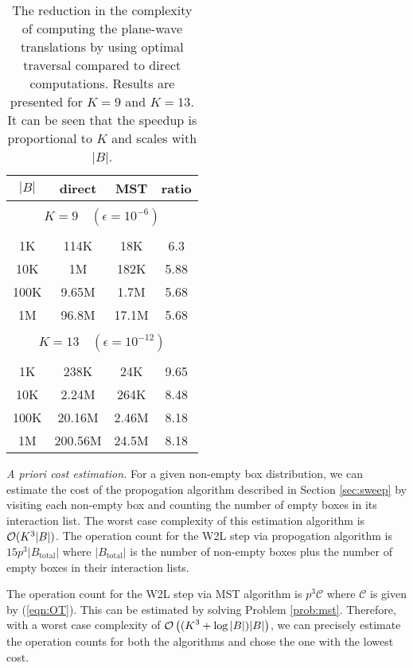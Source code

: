 \begin{table}
\caption{The reduction in the complexity of computing the plane-wave translations by using optimal traversal compared to direct computations. Results are presented for $K=9$ and $K=13$. It can be seen that the speedup is proportional to $K$ and scales with $|B|$.}
\centering
\begin{tabular}{cccc} \hline
        $|B|$  &  direct & MST & ratio \\ \hline       
        \multicolumn{4}{c}{}  \\
        \multicolumn{4}{c}{ {\small $K =  9 \quad (\epsilon = 10^{-6})$}}  \\
        \multicolumn{4}{c}{}  \\
         1K & 114K & 18K & 6.3 \\  
        10K & 1M & 182K & 5.88 \\  
       100K & 9.65M & 1.7M & 5.68 \\  
       1M & 96.8M & 17.1M & 5.68 \\  
       \multicolumn{4}{c}{}  \\
       \multicolumn{4}{c}{ {\small $K =  13 \quad (\epsilon = 10^{-12})$}}  \\
       \multicolumn{4}{c}{}  \\
             1K & 238K & 24K & 9.65 \\  
        10K & 2.24M & 264K & 8.48 \\  
        100K & 20.16M & 2.46M & 8.18 \\  
       1M &   200.56M & 24.5M & 8.18 \\   
\hline
\end{tabular} \label{tab:ratio}
\end{table}

{\em A priori cost estimation.} For a given non-empty box distribution, we can estimate the cost of the propogation algorithm  described in Section \ref{sec:sweep} by visiting each non-empty box and counting the number of empty boxes in its interaction list. The worst case complexity of this estimation algorithm is $\mathcal{O}(K^3 |B|)$. The operation count for the W2L step via propogation algorithm is $15 p^3 |B_{\text{total}}|$ where $|B_{\text{total}}|$ is the number of non-empty boxes plus the number of empty boxes in their interaction lists. 

The operation count for the W2L step via MST algorithm is $p^3 \mathcal{C}$ where $\mathcal{C}$ is given by (\ref{eqn:OT}). This can be estimated by solving Problem \ref{prob:mst}. Therefore, with a worst case complexity of $\displaystyle \mathcal{O} \left((K^3 + \log |B|) |B|\right)$, we can precisely estimate the operation counts for both the algorithms and chose the one with the lowest cost. 

